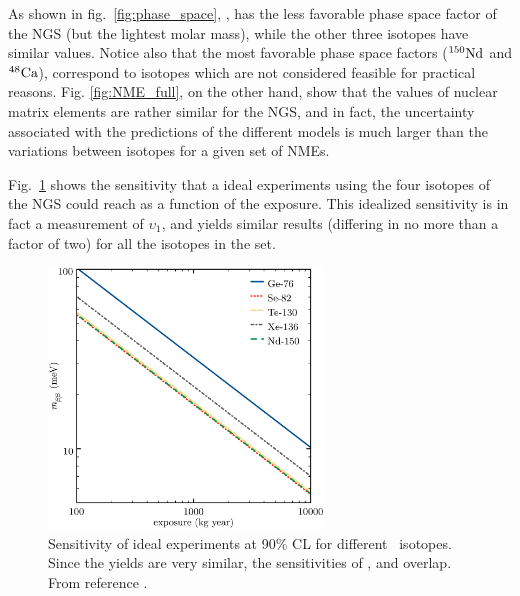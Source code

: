 As shown in fig.~\ref{fig:phase_space}, 
, has the less favorable phase space factor of the NGS (but the lightest molar mass), while the other three isotopes have similar values. Notice also that the most favorable phase space factors (${\rm ^{150}Nd}$ and ${\rm ^{48}Ca}$), correspond to isotopes which are not considered feasible for practical reasons.   
Fig. \ref{fig:NME_full}, on the other hand, show that the values of nuclear matrix elements are rather similar for the NGS, and in fact, the uncertainty associated with the predictions of the different models is much larger than the variations between isotopes for a given set of NMEs. 

Fig.~\ref{fig:SensiIdeal} shows the sensitivity that a ideal experiments using the four isotopes of the NGS could reach as a function of the exposure. This idealized  sensitivity is in fact a measurement of $\upsilon_1$, and yields similar results (differing in no more than a factor of two) for all the isotopes in the set.

 
\begin{figure}[t!b!]
\begin{center}
\includegraphics[width=0.65\textwidth]{img/isotopes_sensi.eps}
\end{center}
\caption{Sensitivity of ideal experiments at 90\% CL for different \bb\ isotopes. Since the yields are very similar, the sensitivities of ,  and  overlap. From reference \cite{Gomez-Cadenas:2010zcc}.} \label{fig:SensiIdeal}	
\end{figure}

